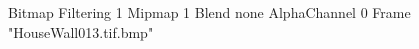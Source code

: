 {Bitmap
	{Filtering 1}
	{Mipmap 1}
	{Blend none}
	{AlphaChannel 0}
	{Frame "HouseWall013.tif.bmp"}
}

